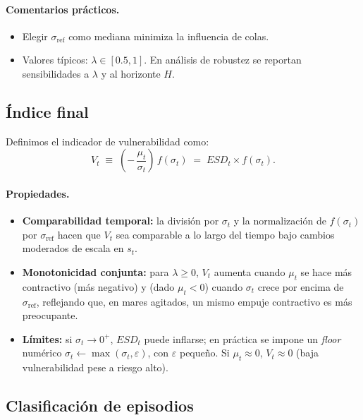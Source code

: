 \documentclass[11pt,a4paper]{article}
\newcommand{\1}{\mathbf{1}}
\begin{document}
\paragraph{Comentarios prácticos.}
\begin{itemize}
  \item Elegir $\sigma_{\text{ref}}$ como mediana minimiza la influencia de colas.
  \item Valores típicos: $\lambda \in [0.5,1]$. En análisis de robustez se reportan sensibilidades a $\lambda$ y al horizonte $H$.
\end{itemize}

\subsection{Índice final}

Definimos el indicador de vulnerabilidad como:
\begin{equation}
\label{eq:index_final}
V_t 
\;\equiv\; 
\left(-\,\frac{\mu_t}{\sigma_t}\right)\, f(\sigma_t)
\;=\;
ESD_t \times f(\sigma_t).
\end{equation}

\paragraph{Propiedades.}
\begin{itemize}
  \item \textbf{Comparabilidad temporal:} la división por $\sigma_t$ y la normalización de $f(\sigma_t)$ por $\sigma_{\text{ref}}$ hacen que $V_t$ sea comparable a lo largo del tiempo bajo cambios moderados de escala en $s_t$.
  \item \textbf{Monotonicidad conjunta:} para $\lambda \ge 0$, $V_t$ aumenta cuando $\mu_t$ se hace más contractivo (más negativo) y (dado $\mu_t<0$) cuando $\sigma_t$ crece por encima de $\sigma_{\text{ref}}$, reflejando que, en mares agitados, un mismo empuje contractivo es más preocupante.
  \item \textbf{Límites:} si $\sigma_t \to 0^+$, $ESD_t$ puede inflarse; en práctica se impone un \emph{floor} numérico $\sigma_t \leftarrow \max(\sigma_t,\varepsilon)$, con $\varepsilon$ pequeño. Si $\mu_t \approx 0$, $V_t \approx 0$ (baja vulnerabilidad pese a riesgo alto).
\end{itemize}

\subsection{Clasificación de episodios}
\end{document}
